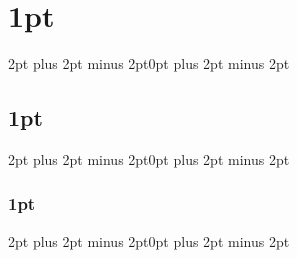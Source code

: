\documentclass[twoside, openany, phd]{IUST-Thesis} %
\begin{document}
\titlespacing\section{1pt}{2pt plus 2pt minus 2pt}{0pt plus 2pt minus 2pt}
\titlespacing\subsection{1pt}{2pt plus 2pt minus 2pt}{0pt plus 2pt minus 2pt}
\titlespacing\subsubsection{1pt}{2pt plus 2pt minus 2pt}{0pt plus 2pt minus 2pt}
\setlength{\textfloatsep}{10pt}
%
\setlength{\abovedisplayskip}{1pt}
\setlength{\belowdisplayskip}{1pt}


%

\hypertarget{tableofcontent}{\tableofcontents}\label{tableofcontent2} %
\clearpage

\listoffigures 
\clearpage

\listoftables
\clearpage


\printacronyms
\clearpage

\pagestyle{fancy}

\clearpage
\fancyhead[LO, RE]{\slshape }
\onehalfspacing



\clearpage
\appendix %
\fancyhead[LO,RE]{\slshape \leftmark}
%
%
\clearpage

\fancyhead[LO, RE]{\slshape}
\onehalfspacing
\printglossary %
\clearpage
{}
\end{document}
